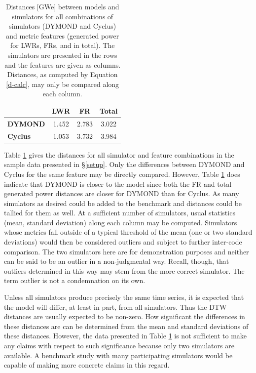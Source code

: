 \begin{table}[htb]
\centering
\caption{Distances [GWe] between models and simulators for all combinations of 
simulators (DYMOND and Cyclus) and metric features (generated power for 
LWRs, FRs, and in total). The simulators are presented in the rows and the
features are given as columns. Distances, as computed by 
Equation \ref{d-calc}, may only be compared along each column.}
\label{d-compare}
\begin{tabular}{l||c||c||c|}
                & \textbf{LWR} & \textbf{FR} & \textbf{Total} \\
\hline
\textbf{DYMOND} & 1.452        & 2.783       & 3.022          \\
\hline
\textbf{Cyclus} & 1.053        & 3.732       & 3.984          \\
\hline
\end{tabular}
\end{table}

Table \ref{d-compare} gives the distances for all simulator and feature 
combinations in the sample data presented in \S\ref{setup}. Only the differences between DYMOND and 
Cyclus for the same feature may be directly compared.  However, Table \ref{d-compare} 
does indicate that DYMOND is closer to the model since both the FR and total
generated power distances are closer for DYMOND than for Cyclus.  As many
simulators as desired could be added to the benchmark and distances could 
be tallied for them as well. At a sufficient number of simulators, usual 
statistics (mean, standard deviation) along each column may be computed.
Simulators whose metrics fall outside of a typical threshold of the mean
(one or two standard deviations) would then be considered outliers and 
subject to further inter-code comparison. The two simulators here are 
for demonstration purposes and neither can be said to be an outlier in a
non-judgmental way. Recall, though, that outliers determined in this way 
may stem from the more correct simulator. The term outlier is not a 
condemnation on its own.

Unless all simulators produce precisely the same time series, it is 
expected that the model will differ, at least in part, from all simulators.
Thus the DTW distances are usually expected to be non-zero. How significant
the differences in these distances are can be determined from the mean
and standard deviations of these distances.  However, the data presented
in Table \ref{d-compare} is not sufficient to make any claims with respect
to such significance because only two simulators are available. A benchmark 
study with many participating simulators would be capable of making more 
concrete claims in this regard.

